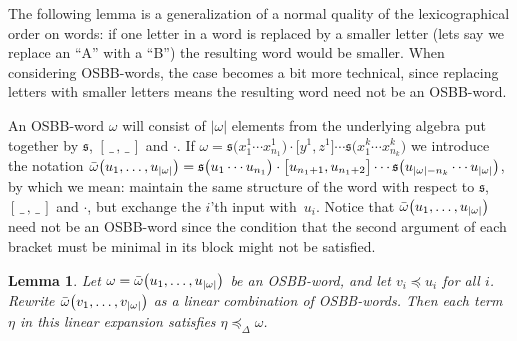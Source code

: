 \documentclass[10pt,a4paper]{amsart}
\newcommand{\noarg}{\,\_\,}
\numberwithin{equation}{section}
\newtheorem{Lemma}[Theorem]{Lemma}
\begin{document}
The following lemma is a generalization of a normal quality of the lexicographical order on words: if one letter in a word is replaced by a smaller letter (lets say we replace an ``A'' with a ``B'') the resulting word would be smaller. When considering OSBB-words, the case becomes a bit more technical, since replacing letters with smaller letters means the resulting word need not be an OSBB-word.

An OSBB-word $\omega$ will consist of $|\omega|$ elements from the underlying algebra put together by $\mathfrak{s}$, $[\noarg , \noarg]$ and $\cdot$. If $\omega = \mathfrak{s}\bigl(x_1^1 \cdots x_{n_1}^1\bigr) \cdot\bigl[y^1, z^1\bigr] \cdots \mathfrak{s}\bigl(x^k_1 \cdots x^k_{n_k}\bigr)$ we introduce the notation $\Bar{\omega}\bigl(u_1 , \dots , u_{|\omega|}\bigr) = \mathfrak{s}\bigl(u_1 \cdots u_{n_1}\bigr) \cdot \bigl[u_{n_1 +1}, u_{n_1 +2}\bigr] \cdots \mathfrak{s}\bigl(u_{|\omega|-n_k} \cdots u_{|\omega|}\bigr)$, by which we mean: maintain the same structure of the word with respect to $\mathfrak{s}$, $[\noarg , \noarg]$ and $\cdot$, but exchange the $i$'th input with~$u_i$. Notice that $\Bar{\omega}\bigl(u_1 , \dots , u_{|\omega|}\bigr)$ need not be an OSBB-word since the condition that the second argument of each bracket must be minimal in its block might not be satisfied.


\begin{Lemma}\label{lemma:smaller_OSBB}
 Let $\omega = \Bar{\omega}\bigl(u_1 , \dots , u_{|\omega|}\bigr)$ be an OSBB-word, and let $v_i \preceq u_i$ for all $i$. Rewrite $\Bar{\omega}\bigl(v_1 , \dots , v_{|\omega|}\bigr)$ as a linear combination of OSBB-words. Then each term $\eta$ in this linear expansion satisfies $\eta \preceq_{\Delta} \omega$.
\end{Lemma}
\end{document}
